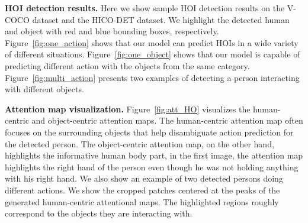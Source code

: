 \documentclass{bmvc2k}
\newcommand {\para}[1]{\vspace{1.5mm} \noindent \textbf{#1}}
\newcommand{\figref}[1]{Figure~\ref{fig:#1}}
\begin{document}
\para{HOI detection results.}
Here we show sample HOI detection results on the V-COCO dataset and the HICO-DET dataset. We highlight the detected human and object with red and blue bounding boxes, respectively.
\figref{one_action} shows that our model can predict HOIs in a wide variety of different situations.
\figref{one_object} shows that our model is capable of predicting different action with the objects from the same category.
\figref{multi_action} presents two examples of detecting a person interacting with different objects. 



\para{Attention map visualization.}
\figref{att_HO} visualizes the human-centric and object-centric attention maps.
The human-centric attention map often focuses on the surrounding objects that help disambiguate action prediction for the detected person.
The object-centric attention map, on the other hand, highlights the informative human body part, \eg in the first image, the attention map highlights the right hand of the person even though he was not holding anything with his right hand.
We also show an example of two detected persons doing different actions.
We show the cropped  patches centered at the peaks of the generated human-centric attentional maps. 
The highlighted regions roughly correspond to the objects they are interacting with.
\end{document}
